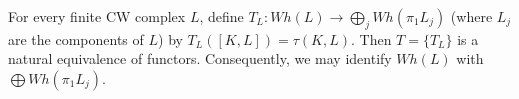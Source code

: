 For every finite CW complex $L$, define $T_L: Wh(L) \to \bigoplus_j Wh(\pi_1 L_j)$ (where $L_j$ are the components of $L$) by $T_L([K, L]) = \tau(K, L)$. Then $T = \{T_L\}$ is a natural equivalence of functors. Consequently, we may identify $Wh(L)$ with $\bigoplus Wh(\pi_1 L_j)$.
